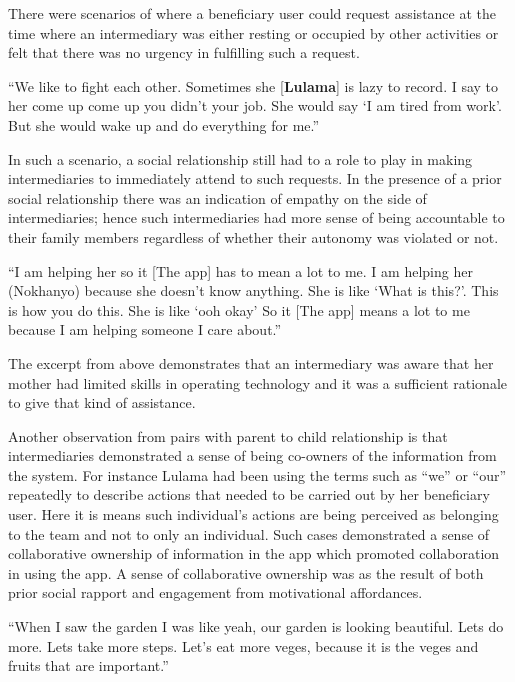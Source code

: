 There were scenarios of where a beneficiary user could request assistance at the time where an intermediary was either resting or occupied by other activities or felt that there was no urgency in fulfilling  such a request. 

 {``We like to fight each other. Sometimes she [\textbf{Lulama}] is lazy to record. I say to her come up come up you didn’t your job. She would say `I am tired from work'. But she would wake up and do everything for me.''}

In such a scenario, a social relationship still had to a role to play in making intermediaries to immediately attend to such requests. In the presence of a prior social relationship there was an indication of empathy on the side of intermediaries; hence such intermediaries had more sense of being accountable to their family members regardless of whether their autonomy was violated or not.  

 {``I am helping her so it [The app] has to mean a lot to me. I am helping her (Nokhanyo) because she doesn't know anything. She is like `What is this?'. This is how you do this. She is like `ooh okay' So it [The app] means a lot to me because I am helping someone I care about.''}

The excerpt from above demonstrates that an intermediary was aware that her mother had limited skills in operating technology and it was a sufficient rationale to give that kind of assistance.

Another observation from pairs with parent to child relationship is that  intermediaries demonstrated a sense of being co-owners of the information from the system. For instance Lulama had been using the terms such as ``we'' or ``our'' repeatedly to describe actions that needed to be carried out by her beneficiary user. Here it is means such individual's actions are being perceived as belonging to the team and not to only an individual. Such cases demonstrated  a sense of collaborative ownership of information in the app which promoted collaboration in using the app. A sense of collaborative ownership was as the result of both prior social rapport and engagement from motivational affordances.
  
 {``When I saw the garden I was like yeah, our garden is looking beautiful. Lets do more. Lets take more steps. Let's eat more veges, because it is the veges and fruits that are important.''}

